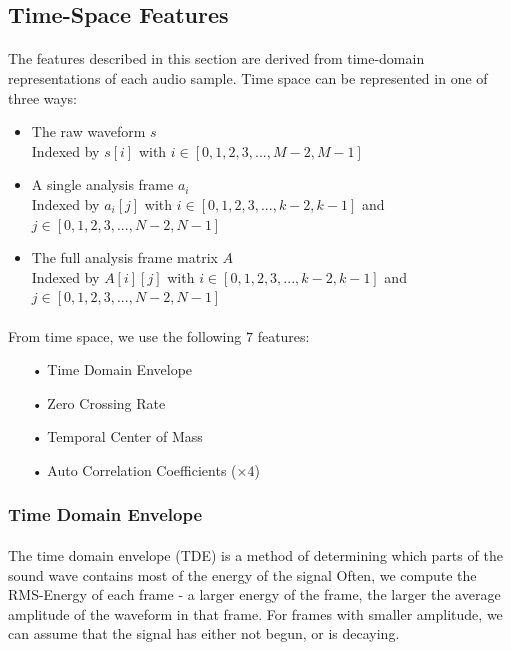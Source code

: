 \documentclass[12pt,letterpaper]{article}
\begin{document}

\newpage

\subsection{Time-Space Features}
\label{subsec-time}

\paragraph*{}The features described in this section are derived from time-domain representations of each audio sample. Time space can be represented in one of three ways: 
\begin{itemize}
\item The raw waveform $s$\\
Indexed by $s[i]$ with $i \in [0,1,2,3,...,M-2,M-1]$
\item A single analysis frame $a_i$ \\
Indexed by $a_i[j]$ with $i \in [0,1,2,3,...,k-2,k-1]$ and $j \in [0,1,2,3,...,N-2,N-1]$
\item The full analysis frame matrix $A$ \\
Indexed by $A[i][j]$ with $i \in [0,1,2,3,...,k-2,k-1]$ and $j \in [0,1,2,3,...,N-2,N-1]$
\end{itemize}

\paragraph*{}From time space, we use the following $7$ features:
\begin{itemize}
\item[•] Time Domain Envelope
\item[•] Zero Crossing Rate
\item[•] Temporal Center of Mass
\item[•] Auto Correlation Coefficients ($\times 4$)
\end{itemize}


\subsubsection{Time Domain Envelope}

\paragraph*{}The time domain envelope (TDE) is a method of determining which parts of the sound wave contains most of the energy of the signal Often, we compute the RMS-Energy of each frame - a larger energy of the frame, the larger the average amplitude of the waveform in that frame. For frames with smaller amplitude, we can assume that the signal has either not begun, or is decaying. 
\end{document}
